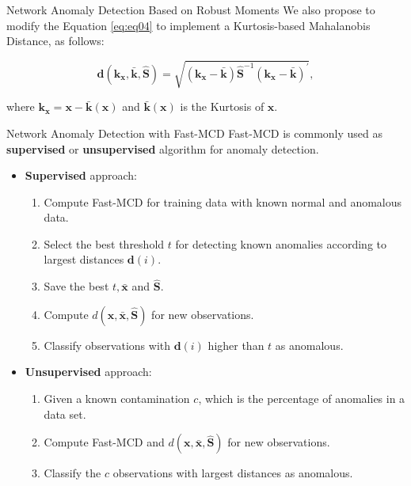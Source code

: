 \documentclass[newPxFont, numfooter, sectionpages]{beamer}
\begin{document}
\begin{frame}{Network Anomaly Detection Based on Robust Moments}
    We also propose to modify the Equation \ref{eq:eq04} to implement a Kurtosis-based Mahalanobis Distance, as follows:
    
    \begin{equation}\label{eq:eq09}
		\boldsymbol{d}(\boldsymbol{k}_{\boldsymbol{x}}, \bar{\boldsymbol{k}}, \boldsymbol{\hat{S}}) = \sqrt{(\boldsymbol{k}_{\boldsymbol{x}} - \bar{\boldsymbol{k}}) \boldsymbol{\hat{S}}^{-1}(\boldsymbol{k}_{\boldsymbol{x}} - \bar{\boldsymbol{k}})^\prime}, 
	\end{equation}
	
	where $\boldsymbol{k}_{\boldsymbol{x}} = \boldsymbol{x} - \boldsymbol{\bar{k}}(\boldsymbol{x})$ and $\boldsymbol{\bar{k}}(\boldsymbol{x})$ is the Kurtosis of $\boldsymbol{x}$.
\end{frame}

\begin{frame}[c]{Network Anomaly Detection with Fast-MCD}
	Fast-MCD is commonly used as \textbf{supervised} or \textbf{unsupervised} algorithm for anomaly detection.
    \begin{itemize}		
		\item \textbf{Supervised} approach:
		\begin{enumerate}
		    \item Compute Fast-MCD for training data with known normal and anomalous data.
		    \item Select the best threshold $t$ for detecting known anomalies according to largest distances $\boldsymbol{d}(i)$.
		    \item Save the best $t, \boldsymbol{\bar{x}}$ and $\boldsymbol{\hat{S}}$.
		    \item Compute $d(\boldsymbol{x},\bar{\boldsymbol{x}}, \boldsymbol{\hat{S}})$ for new observations.
		    \item Classify observations with $\boldsymbol{d}(i)$ higher than $t$ as anomalous.
		\end{enumerate}
		\item \textbf{Unsupervised} approach:
		\begin{enumerate}
			\item Given a known contamination $c$, which is the percentage of anomalies in a data set.
			\item Compute Fast-MCD and $d(\boldsymbol{x},\bar{\boldsymbol{x}}, \boldsymbol{\hat{S}})$ for new observations.
			\item Classify the $c$ observations with largest distances as anomalous.
		\end{enumerate}
	\end{itemize}
\end{frame}
\end{document}
